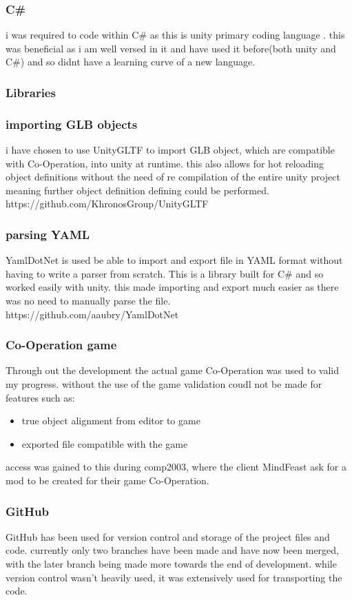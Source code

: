 \subsubsection{C\#}
i was required to code within C\# as this is unity primary coding language . this was beneficial as i am well versed in it and have used it before(both unity and C\#) and so didnt have a learning curve of a new language.

\subsubsection{Libraries}
\subsubsection*{importing GLB objects}
i have chosen to use UnityGLTF to import GLB object, which are compatible with Co-Operation, into unity at runtime. this also allows for hot reloading object definitions without the need of re compilation of the entire unity project meaning further object definition defining could be performed.\\
https://github.com/KhronosGroup/UnityGLTF
\subsubsection*{parsing YAML}
YamlDotNet is used be able to import and export file in YAML format without having to write a parser from scratch. This is a library built for C\# and so worked easily with unity. this made importing and export much easier as there was no need to manually parse the file.\\
https://github.com/aaubry/YamlDotNet 
\subsubsection{Co-Operation game}
Through out the development the actual game Co-Operation was used to valid my progress. without the use of the game validation coudl not be made for features such as: 
\begin{itemize}
	\item true object alignment from editor to game
	\item exported file compatible with the game
\end{itemize}
access was gained to this during comp2003, where the client MindFeast ask for a mod to be created for their game Co-Operation.
\subsubsection{GitHub}
GitHub has been used for version control and storage of the project files and code. currently only two branches have been made and have now been merged, with the later branch being made more towards the end of development. while version control wasn't heavily used, it was extensively used for transporting the code.

